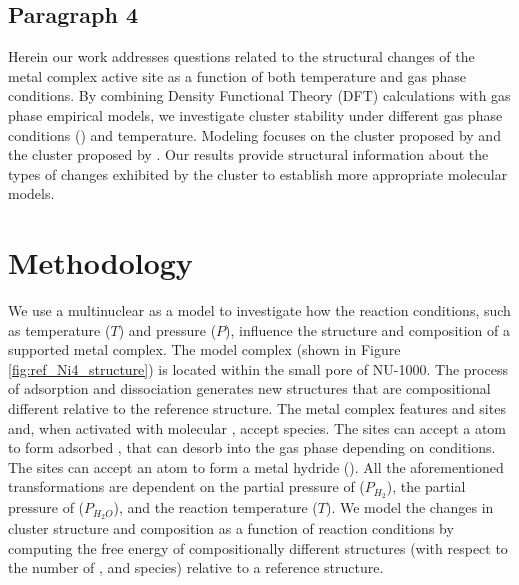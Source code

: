 \documentclass[journal=jctcce,manuscript=article]{achemso}
\begin{document}
\subsection{Paragraph 4}
Herein our work addresses questions related to the structural changes of the metal complex active site as a function of both temperature and gas phase conditions. By combining Density Functional Theory (DFT) calculations with gas phase empirical models, we investigate cluster stability under different gas phase conditions () and temperature. Modeling focuses on the  cluster proposed by \citeauthor{PlateroPrats2017} and the  cluster proposed by \cite{Ikuno2017}. Our results provide structural information about the types of changes exhibited by the cluster to establish more appropriate molecular models. 



\newpage

\section{Methodology}
We use a multinuclear  as a model to investigate how the reaction conditions, such as temperature ($T$) and pressure ($P$), influence the structure and composition of a supported metal complex. The model  complex (shown in Figure \ref{fig:ref_Ni4_structure}) is located within the small pore of NU-1000. The process of  adsorption and dissociation generates new structures that are compositional different relative to the reference structure. The metal complex features  and  sites and, when activated with molecular , accept  species. The  sites can accept a  atom to form adsorbed , that can desorb into the gas phase depending on conditions. The  sites can accept an  atom to form a metal hydride (). All the aforementioned transformations are dependent on the partial pressure of  ($P_{H_2}$), the partial pressure of  ($P_{H_{2}O}$), and the reaction temperature ($T$). We model the changes in cluster structure and composition as a function of reaction conditions by computing the free energy of compositionally different structures (with respect to the number of ,  and  species) relative to a reference structure. 
\end{document}
